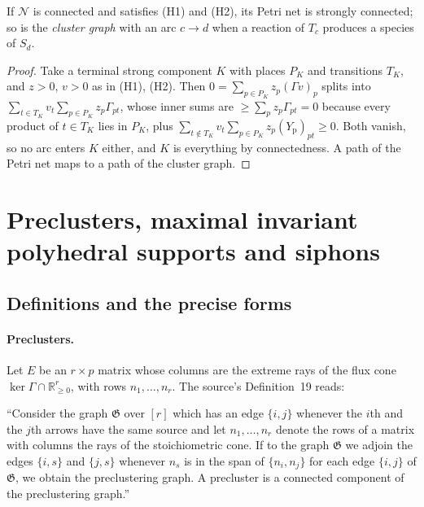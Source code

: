 \documentclass[11pt,a4paper]{report}
\newcommand{\Net}{\mathcal{N}}
\newcommand{\Yp}{Y_{\mathrm p}}
\newcommand{\Rnn}{\mathbb{R}_{\ge 0}}
\begin{document}
\begin{lemma}\label{lem:SC}
If \(\Net\) is connected and satisfies (H1) and (H2), its Petri net is strongly connected; so is the \emph{cluster
graph} with an arc \(c\to d\) when a reaction of \(T_c\) produces a species of \(S_d\).
\end{lemma}
\begin{proof}
Take a terminal strong component \(K\) with places \(P_K\) and transitions \(T_K\), and \(z>0\), \(v>0\) as in (H1),
(H2). Then \(0=\sum_{p\in P_K}z_p(\Gamma v)_p\) splits into \(\sum_{t\in T_K}v_t\sum_{p\in P_K}z_p\Gamma_{pt}\), whose
inner sums are \(\ge\sum_pz_p\Gamma_{pt}=0\) because every product of \(t\in T_K\) lies in \(P_K\), plus
\(\sum_{t\notin T_K}v_t\sum_{p\in P_K}z_p(\Yp)_{pt}\ge0\). Both vanish, so no arc enters \(K\) either, and \(K\) is
everything by connectedness. A path of the Petri net maps to a path of the cluster graph.
\end{proof}

\section{Preclusters, maximal invariant polyhedral supports and siphons}\label{sec:preclusters}

\subsection{Definitions and the precise forms}\label{sec:precise}

\paragraph{Preclusters.} Let \(E\) be an \(r\times p\) matrix whose columns are the extreme rays of the flux cone
\(\ker\Gamma\cap\Rnn^r\), with rows \(n_1,\dots,n_r\). The source's Definition~19 reads:

\begin{openquote}
``Consider the graph \(\mathfrak G\) over \([r]\) which has an edge \(\{i,j\}\) whenever the \(i\)th and the \(j\)th
arrows have the same source and let \(n_1,\dots,n_r\) denote the rows of a matrix with columns the rays of the
stoichiometric cone. If to the graph \(\mathfrak G\) we adjoin the edges \(\{i,s\}\) and \(\{j,s\}\) whenever \(n_s\)
is in the span of \(\{n_i,n_j\}\) for each edge \(\{i,j\}\) of \(\mathfrak G\), we obtain the preclustering graph. A
precluster is a connected component of the preclustering graph.''
\end{openquote}
\end{document}
